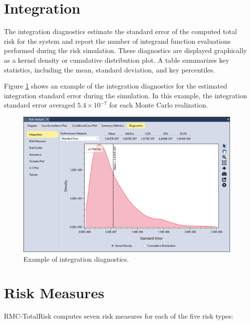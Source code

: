 \documentclass[
]{book}
\begin{document}
\hypertarget{integration}{%
\section{Integration}\label{integration}}

The integration diagnostics estimate the standard error of the computed total risk for the system and report the number of integrand function evaluations performed during the risk simulation. These diagnostics are displayed graphically as a kernel density or cumulative distribution plot. A table summarizes key statistics, including the mean, standard deviation, and key percentiles.

Figure \ref{fig:figure-143} shows an example of the integration diagnostics for the estimated integration standard error during the simulation. In this example, the integration standard error averaged \(5.4×10^{-7}\) for each Monte Carlo realization.

\begin{figure}

{\centering \includegraphics{images/figure143} 

}

\caption{Example of integration diagnostics.}\label{fig:figure-143}
\end{figure}

\hypertarget{risk-measures}{%
\section{Risk Measures}\label{risk-measures}}

RMC-TotalRisk computes seven risk measures for each of the five risk types:
\end{document}

